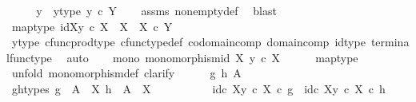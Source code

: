 \begin{isabellebody}
\isamarkupfalse%
\ {\isacharminus}{\kern0pt}\isanewline
\ \ \isamarkupfalse%
\ y\ \ y{\isacharunderscore}{\kern0pt}type{\isacharcolon}{\kern0pt}\ {\isachardoublequoteopen}y\ {\isasymin}\isactrlsub c\ Y{\isachardoublequoteclose}\isanewline
\ \ \isamarkupfalse%
\ assms\ nonempty{\isacharunderscore}{\kern0pt}def\ \isamarkupfalse%
\ blast\isanewline
\ \ \isamarkupfalse%
\ map{\isacharunderscore}{\kern0pt}type{\isacharcolon}{\kern0pt}\ {\isachardoublequoteopen}{\isasymlangle}id{\isacharparenleft}{\kern0pt}X{\isacharparenright}{\kern0pt}{\isacharcomma}{\kern0pt}y\ {\isasymcirc}\isactrlsub c\ {\isasymbeta}\isactrlbsub X\isactrlesub {\isasymrangle}\ {\isacharcolon}{\kern0pt}\ X\ {\isasymrightarrow}\ X\ {\isasymtimes}\isactrlsub c\ Y{\isachardoublequoteclose}\isanewline
\ \ \ \isamarkupfalse%
\ y{\isacharunderscore}{\kern0pt}type\ cfunc{\isacharunderscore}{\kern0pt}prod{\isacharunderscore}{\kern0pt}type\ cfunc{\isacharunderscore}{\kern0pt}type{\isacharunderscore}{\kern0pt}def\ codomain{\isacharunderscore}{\kern0pt}comp\ domain{\isacharunderscore}{\kern0pt}comp\ id{\isacharunderscore}{\kern0pt}type\ terminal{\isacharunderscore}{\kern0pt}func{\isacharunderscore}{\kern0pt}type\ \isamarkupfalse%
\ auto\isanewline
\ \ \isamarkupfalse%
\ mono{\isacharcolon}{\kern0pt}\ {\isachardoublequoteopen}monomorphism{\isacharparenleft}{\kern0pt}{\isasymlangle}id\ X{\isacharcomma}{\kern0pt}\ y\ {\isasymcirc}\isactrlsub c\ {\isasymbeta}\isactrlbsub X\isactrlesub {\isasymrangle}{\isacharparenright}{\kern0pt}{\isachardoublequoteclose}\isanewline
\ \ \ \ \isamarkupfalse%
\ map{\isacharunderscore}{\kern0pt}type\isanewline
\ \ \isamarkupfalse%
\ {\isacharparenleft}{\kern0pt}unfold\ monomorphism{\isacharunderscore}{\kern0pt}def{}{\isacharcomma}{\kern0pt}\ clarify{\isacharparenright}{\kern0pt}\isanewline
\ \ \ \ \isamarkupfalse%
\ g\ h\ A\isanewline
\ \ \ \ \isamarkupfalse%
\ g{\isacharunderscore}{\kern0pt}h{\isacharunderscore}{\kern0pt}types{\isacharcolon}{\kern0pt}\ {\isachardoublequoteopen}g\ {\isacharcolon}{\kern0pt}\ A\ {\isasymrightarrow}\ X{\isachardoublequoteclose}\ {\isachardoublequoteopen}h\ {\isacharcolon}{\kern0pt}\ A\ {\isasymrightarrow}\ X{\isachardoublequoteclose}\isanewline
\ \ \ \ \isanewline
\ \ \ \ \isamarkupfalse%
\ {\isachardoublequoteopen}{\isasymlangle}id\isactrlsub c\ X{\isacharcomma}{\kern0pt}y\ {\isasymcirc}\isactrlsub c\ {\isasymbeta}\isactrlbsub X\isactrlesub {\isasymrangle}\ {\isasymcirc}\isactrlsub c\ g\ {\isacharequal}{\kern0pt}\ {\isasymlangle}id\isactrlsub c\ X{\isacharcomma}{\kern0pt}y\ {\isasymcirc}\isactrlsub c\ {\isasymbeta}\isactrlbsub X\isactrlesub {\isasymrangle}\ {\isasymcirc}\isactrlsub c\ h{\isachardoublequoteclose}\isanewline

\end{isabellebody}
